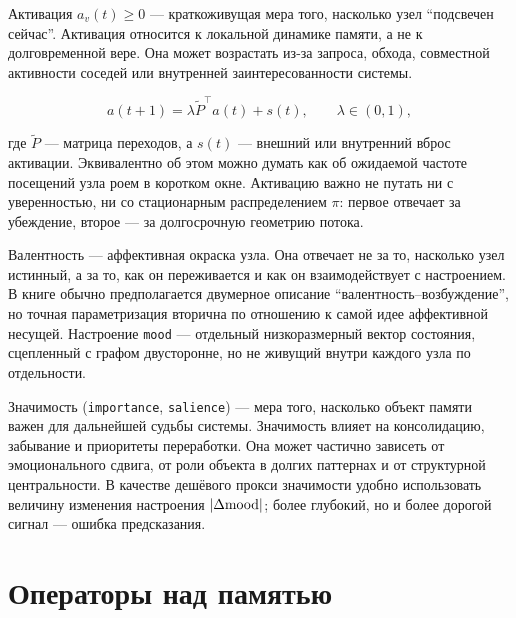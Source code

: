 \begin{definition}[Активация]
Активация $a_v(t) \ge 0$ --- краткоживущая мера того, насколько узел
``подсвечен сейчас''. Активация относится к локальной динамике памяти, а не к
долговременной вере. Она может возрастать из-за запроса, обхода, совместной
активности соседей или внутренней заинтересованности системы.
\end{definition}

\begin{equation}
a(t + 1) = \lambda \tilde{P}^{\top} a(t) + s(t), \qquad \lambda \in (0, 1),
\end{equation}

где $\tilde{P}$ --- матрица переходов, а $s(t)$ --- внешний или внутренний
вброс активации. Эквивалентно об этом можно думать как об ожидаемой частоте
посещений узла роем в коротком окне. Активацию важно не путать ни с
уверенностью, ни со стационарным распределением $\pi$: первое отвечает за
убеждение, второе --- за долгосрочную геометрию потока.

\begin{definition}
Валентность --- аффективная окраска узла. Она отвечает не за то, насколько узел
истинный, а за то, как он переживается и как он взаимодействует с настроением.
В книге обычно предполагается двумерное описание ``валентность--возбуждение'',
но точная параметризация вторична по отношению к самой идее аффективной
несущей. Настроение \texttt{mood} --- отдельный низкоразмерный вектор
состояния, сцепленный с графом двусторонне, но не живущий внутри каждого узла
по отдельности.
\end{definition}

\begin{definition}[Значимость]
Значимость (\texttt{importance}, \texttt{salience}) --- мера того, насколько
объект памяти важен для дальнейшей судьбы системы. Значимость влияет на
консолидацию, забывание и приоритеты переработки. Она может частично зависеть
от эмоционального сдвига, от роли объекта в долгих паттернах и от структурной
центральности. В качестве дешёвого прокси значимости удобно использовать
величину изменения настроения $|\Delta \mathrm{mood}|$; более глубокий, но и более
дорогой сигнал --- ошибка предсказания.
\end{definition}

\section{Операторы над памятью}


